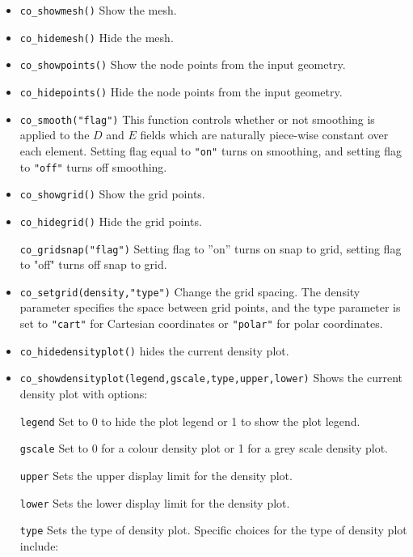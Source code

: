 \begin{itemize}
\item \texttt{co\_showmesh()} Show the mesh.

\item \texttt{co\_hidemesh()} Hide the mesh.

\item \texttt{co\_showpoints()} Show the node points from the input geometry.

\item \texttt{co\_hidepoints()} Hide the node points from the input geometry.

\item \texttt{co\_smooth("flag")} This function controls whether or not smoothing is
applied to the $D$ and $E$ fields which are naturally piece-wise
constant over each element. Setting flag equal to \texttt{"on"}
turns on smoothing, and setting flag to \texttt{"off"} turns off
smoothing.

\item \texttt{co\_showgrid()} Show the grid points.

\item \texttt{co\_hidegrid()} Hide the grid points.

\texttt{co\_gridsnap("flag")} Setting flag to ''on'' turns on snap to grid,
setting flag to "off" turns off snap to grid.

\item \texttt{co\_setgrid(density,"type")} Change the grid spacing. The density
parameter specifies the space between grid points, and the type
parameter is set to \texttt{"cart"} for Cartesian coordinates or
\texttt{"polar"} for polar coordinates.

\item \texttt{co\_hidedensityplot()} hides the current density plot.

\item \texttt{co\_showdensityplot(legend,gscale,type,upper,lower)} Shows the
current density plot with options:

\texttt{legend} Set to 0 to hide the plot legend or 1 to show the plot
legend.

\texttt{gscale} Set to 0 for a colour density plot or 1 for a grey scale
density plot.

\texttt{upper} Sets the upper display limit for the density plot.

\texttt{lower} Sets the lower display limit for the density plot.

\texttt{type} Sets the type of density plot. Specific choices for the type of density plot include:


\end{itemize}
